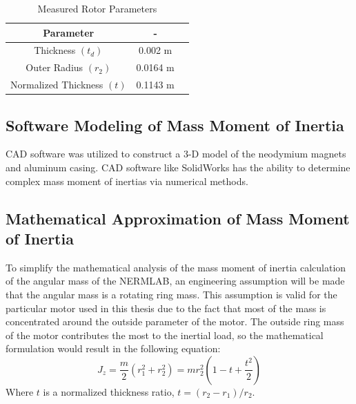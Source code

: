 \begin{table}[ht]
	\begin{center}
		\caption[Measured Rotor Parameters]{Measured Rotor Parameters}
		\begin{tabular}[c]{|c|c|c|}
			
			\hline
			\textbf{Parameter} & \textbf{-}\\
			
			\hline
			Thickness $(t_d)$ &  0.002 m\\
			
			\hline
			Outer Radius $(r_2)$ &  0.0164 m\\
			
			\hline
			Normalized Thickness $(t)$ &  0.1143 m\\
			
			\hline
		\end{tabular}
		
		\label{measured_rotor_parameters}
	\end{center}
\end{table}

\subsection{Software Modeling of Mass Moment of Inertia}
\ac{CAD} software was utilized to construct a 3-D model of the neodymium magnets and aluminum casing. CAD software like SolidWorks has the ability to determine complex mass moment of inertias via numerical methods.

\subsection{Mathematical Approximation of Mass Moment of Inertia}
\label{mathmematical_approximation_J}
To simplify the mathematical analysis of the mass moment of inertia calculation of the angular mass of the NERMLAB, an engineering assumption will be made that the angular mass is a rotating ring mass. This assumption is valid for the particular motor used in this thesis due to the fact that most of the mass is concentrated around the outside parameter of the motor. The outside ring mass of the motor contributes the most to the inertial load, so the mathematical formulation would result in the following equation:
\begin{equation}
\label{eq_J}
J_z = \frac{m}{2}(r_1^2 + r_2^2) = mr_2^2(1-t+\frac{t^2}{2})
\end{equation}
Where $t$ is a normalized thickness ratio, $t = (r_2 - r_1)/r_2$.

